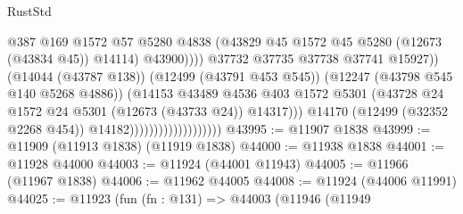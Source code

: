 \begin{lexlean}{RustStd}
\begin{coremodule}
                                                        @387
                                                        @169
                                                        @1572
                                                        @57
                                                        @5280
                                                        @4838
                                                        (@43829
                                                          @45
                                                          @1572
                                                          @45
                                                          @5280
                                                          (@12673 (@43834 @45))
                                                          @14114)
                                                        @43900))))
                                                @37732
                                                @37735
                                                @37738
                                                @37741
                                                @15927))
                                            (@14044 (@43787 @138))
                                            (@12499 (@43791 @453 @545))
                                            (@12247 (@43798 @545 @140 @5268 @4886))
                                            (@14153
                                              @43489
                                              @4536
                                              @403
                                              @1572
                                              @5301
                                              (@43728
                                                @24
                                                @1572
                                                @24
                                                @5301
                                                (@12673 (@43733 @24))
                                                @14317)))
                                          @14170
                                          (@12499 (@32352 @2268 @454))
                                          @14182)))))))))))))))))))
@43995 := @11907 @1838
@43999 := @11909 (@11913 @1838) (@11919 @1838)
@44000 := @11938 @1838
@44001 := @11928 @44000
@44003 := @11924 (@44001 @11943)
@44005 := @11966 (@11967 @1838)
@44006 := @11962 @44005
@44008 := @11924 (@44006 @11991)
@44025 := @11923
    (fun (fn : @131) =>
    @44003
      (@11946
        (@11949

\end{coremodule}
\end{lexlean}
